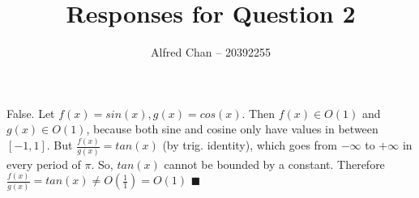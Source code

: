\documentclass[12pt]{article}
\title{Responses for Question 2}
\author{Alfred Chan -- 20392255}
\begin{document}
\maketitle
{\bf

False. Let $f(x) = sin(x), g(x) = cos(x)$. Then $f(x) \in O(1)$ and $g(x) \in O(1)$, because both sine and cosine only have values in between $[-1,1]$. But $\frac{f(x)}{g(x)} = tan(x)$ (by trig. identity), which goes from $-\infty$ to $+\infty$ in every period of $\pi$. So, $tan(x)$ cannot be bounded by a constant. Therefore $\frac{f(x)}{g(x)} = tan(x) \ne O(\frac{1}{1}) = O(1)$ \hfill $\blacksquare$

}
\end{document}
